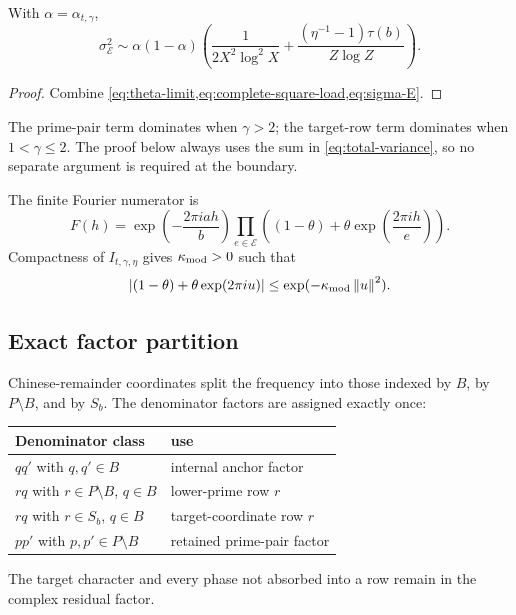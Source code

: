 \begin{proposition}
\label{prop:variance-regimes}
With $\alpha=\alpha_{t,\gamma}$,
\begin{equation}
\label{eq:total-variance}
 \sigma_{\mathcal E}^2\sim\alpha(1-\alpha)
 \left(\frac1{2X^2\log^2X}+\frac{(\eta^{-1}-1)\tau(b)}{Z\log Z}\right).
\end{equation}
\end{proposition}
\begin{proof}
Combine \cref{eq:theta-limit,eq:complete-square-load,eq:sigma-E}.
\end{proof}

The prime-pair term dominates when $\gamma>2$; the target-row term dominates when $1<\gamma\leq2$. The proof below always uses the sum in \cref{eq:total-variance}, so no separate argument is required at the boundary.

The finite Fourier numerator is
\begin{equation}
\label{eq:Fh-definition}
 F(h)=\exp\left(-\frac{2\pi i a h}{b}\right)
 \prod_{e\in\mathcal E}\left((1-\theta)+\theta\exp\left(\frac{2\pi i h}{e}\right)\right).
\end{equation}
Compactness of $I_{t,\gamma,\eta}$ gives $\kappa_{\rm mod}>0$ such that
\begin{equation}
\label{eq:bernoulli-modulus}
 |(1-\theta)+\theta\exp(2\pi i u)|
 \leq\exp(-\kappa_{\rm mod}\left\lVert u\right\rVert^2).
\end{equation}

\subsection{Exact factor partition}

Chinese-remainder coordinates split the frequency into those indexed by $B$, by $P\setminus B$, and by $S_b$. The denominator factors are assigned exactly once:
\begin{center}
\begin{tabular}{ll}
\toprule
Denominator class & use \\
\midrule
$q q'$ with $q,q'\in B$ & internal anchor factor \\
$r q$ with $r\in P\setminus B$, $q\in B$ & lower-prime row $r$ \\
$r q$ with $r\in S_b$, $q\in B$ & target-coordinate row $r$ \\
$p p'$ with $p,p'\in P\setminus B$ & retained prime-pair factor \\
\bottomrule
\end{tabular}
\end{center}
The target character and every phase not absorbed into a row remain in the complex residual factor.
